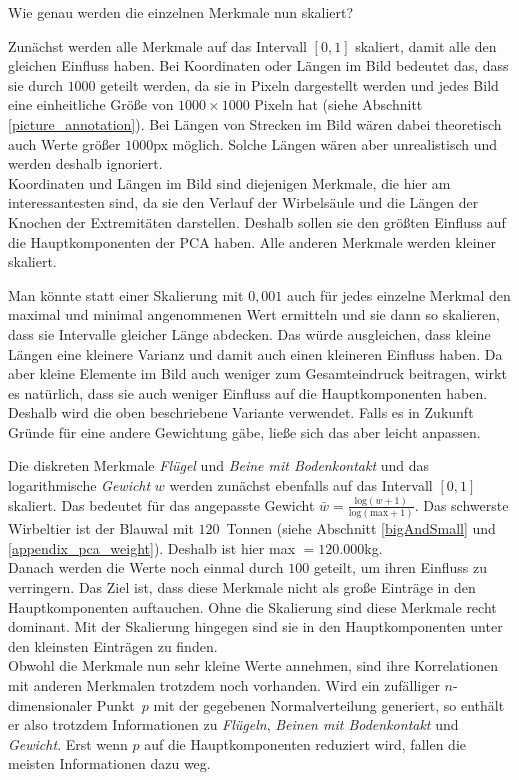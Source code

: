  Wie genau werden die einzelnen Merkmale nun skaliert?
 
 Zunächst werden alle Merkmale auf das Intervall $[0, 1]$ skaliert, damit alle den gleichen Einfluss haben.
 Bei Koordinaten oder Längen im Bild bedeutet das, dass sie durch $1000$ geteilt werden, da sie in Pixeln dargestellt werden und jedes Bild eine einheitliche Größe von $1000 \times 1000$ Pixeln hat (siehe Abschnitt \ref{picture_annotation}). Bei Längen von Strecken im Bild wären dabei theoretisch auch Werte größer $1000$px möglich. Solche Längen wären aber unrealistisch und werden deshalb ignoriert.\\
 Koordinaten und Längen im Bild sind diejenigen Merkmale, die hier am interessantesten sind, da sie den Verlauf der Wirbelsäule und die Längen der Knochen der Extremitäten darstellen. Deshalb sollen sie den größten Einfluss auf die Hauptkomponenten der PCA haben. Alle anderen Merkmale werden kleiner skaliert.
 
 Man könnte statt einer Skalierung mit $0{,}001$ auch für jedes einzelne Merkmal den maximal und minimal angenommenen Wert ermitteln und sie dann so skalieren, dass sie Intervalle gleicher Länge abdecken. Das würde ausgleichen, dass \zb kleine Längen eine kleinere Varianz und damit auch einen kleineren Einfluss haben.
 Da aber kleine Elemente im Bild auch weniger zum Gesamteindruck beitragen, wirkt es natürlich, dass sie auch weniger Einfluss auf die Hauptkomponenten haben.
 Deshalb wird die oben beschriebene Variante verwendet. Falls es in Zukunft Gründe für eine andere Gewichtung gäbe, ließe sich das aber leicht anpassen.
 
 Die diskreten Merkmale \emph{Flügel} und \emph{Beine mit Bodenkontakt} und das logarithmische \emph{Gewicht} $w$ werden zunächst ebenfalls auf das Intervall $[0, 1]$ skaliert. Das bedeutet für das angepasste Gewicht $\bar{w} = \frac{\mathrm{log}(w+1)}{\mathrm{log}(\mathrm{max}+1)}$. Das schwerste Wirbeltier ist der Blauwal mit $120$~Tonnen (siehe Abschnitt \ref{bigAndSmall} und \ref{appendix_pca_weight}). Deshalb ist hier max $= 120.000$kg.\\
 Danach werden die Werte noch einmal durch $100$ geteilt, um ihren Einfluss zu verringern. Das Ziel ist, dass diese Merkmale nicht als große Einträge in den Hauptkomponenten auftauchen. Ohne die Skalierung sind diese Merkmale recht dominant. Mit der Skalierung hingegen sind sie in den Hauptkomponenten unter den kleinsten Einträgen zu finden.\\
 Obwohl die Merkmale nun sehr kleine Werte annehmen, sind ihre Korrelationen mit anderen Merkmalen trotzdem noch vorhanden. Wird ein zufälliger $n$-dimensionaler \mbox{Punkt $p$} mit der gegebenen Normalverteilung generiert, so enthält er also trotzdem Informationen zu \emph{Flügeln}, \emph{Beinen mit Bodenkontakt} und \emph{Gewicht}. Erst wenn $p$ auf die Hauptkomponenten reduziert wird, fallen die meisten Informationen dazu weg.
 
